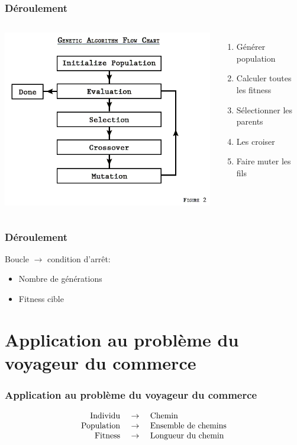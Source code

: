 \documentclass{beamer}
\begin{document}
\begin{frame}
  \frametitle{Déroulement}
  \begin{columns}
        \centering
            \includegraphics[scale=0.4]{GA.png}
        \begin{enumerate}
            \item Générer population \pause{}
            \item Calculer toutes les fitness \pause{}
            \item Sélectionner les parents \pause{}
            \item Les croiser \pause{}
            \item Faire muter les fils
        \end{enumerate}
  \end{columns}
\end{frame}

\begin{frame}
  \frametitle{Déroulement}
  Boucle $\rightarrow$ condition d'arrêt:
  \begin{itemize}
    \item Nombre de générations
    \item Fitness cible 
  \end{itemize}
\end{frame}

\section{Application au problème du voyageur du commerce}
\begin{frame}
  \frametitle{Application au problème du voyageur du commerce}
\[
  \begin{array}{r c l}
    \text{Individu } &\rightarrow& \text{ Chemin} \\
    \text{Population } &\rightarrow& \text{ Ensemble de chemins} \\
    \text{Fitness } &\rightarrow& \text{ Longueur du chemin} 
   \end{array}
\]
\end{frame}
\end{document}
